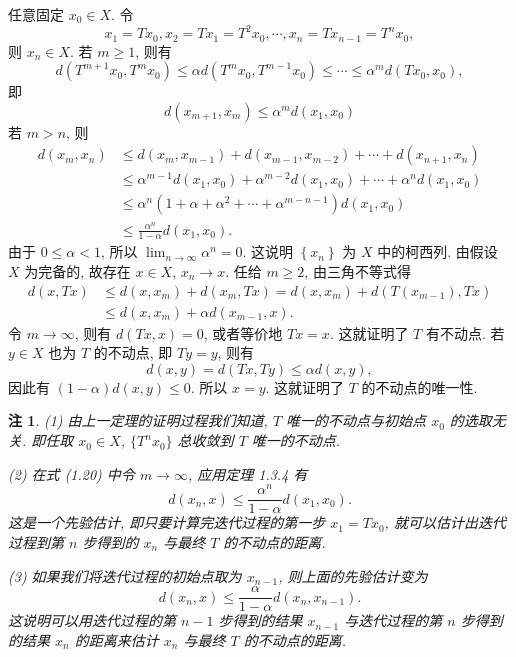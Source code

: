 \documentclass[openany]{ctexbook}
\makeatletter
\theoremstyle{kaiti}
\theoremstyle{normal}
\newtheorem{remark}{注}[section]
\renewenvironment{proof}[1][\proofname]{\par
    \pushQED{\qed}%
    \normalfont \topsep6\p@\@plus6\p@\relax
    \trivlist
    \item\relax
    {\heiti #1}\hspace{2\labelsep}\ignorespaces
  }{%
    \popQED\endtrivlist\@endpefalse
  }
\makeatother
\begin{document}
\begin{proof}
任意固定 $x_0 \in X$. 令
$$
x_1=T x_0, x_2=T x_1=T^2 x_0, \cdots, x_n=T x_{n-1}=T^n x_0,
$$
则 $x_n \in X$. 若 $m \geqslant 1$, 则有
$$
d\left(T^{m+1} x_0, T^m x_0\right) \leqslant \alpha d\left(T^m x_0, T^{m-1} x_0\right) \leqslant \cdots \leqslant \alpha^m d\left(T x_0, x_0\right),
$$
即
$$
d\left(x_{m+1}, x_m\right) \leqslant \alpha^m d\left(x_1, x_0\right)
$$
若 $m>n$, 则
\begin{equation}
  \begin{aligned}
    d\left(x_m, x_n\right) & \leqslant d\left(x_m, x_{m-1}\right)+d\left(x_{m-1}, x_{m-2}\right)+\cdots+d\left(x_{n+1}, x_n\right) \\
    & \leqslant \alpha^{m-1} d\left(x_1, x_0\right)+\alpha^{m-2} d\left(x_1, x_0\right)+\cdots+\alpha^n d\left(x_1, x_0\right) \\
    & \leqslant \alpha^n\left(1+\alpha+\alpha^2+\cdots+\alpha^{m-n-1}\right) d\left(x_1, x_0\right) \\
    & \leqslant \frac{\alpha^n}{1-\alpha} d\left(x_1, x_0\right).
  \end{aligned}
\end{equation}
由于 $0 \leqslant \alpha<1$, 所以 $\lim_{n \rightarrow \infty} \alpha^n=0$. 这说明 $\left\{x_n\right\}$ 为 $X$ 中的柯西列. 由假设 $X$ 为完备的, 故存在 $x \in X$, $x_n \rightarrow x$. 任给 $m \geqslant 2$, 由三角不等式得
$$
\begin{aligned}
d(x, T x) & \leqslant d\left(x, x_m\right)+d\left(x_m, T x\right)=d\left(x, x_m\right)+d\left(T\left(x_{m-1}\right), T x\right) \\
& \leqslant d\left(x, x_m\right)+\alpha d\left(x_{m-1}, x\right).
\end{aligned}
$$
令 $m \rightarrow \infty$, 则有 $d(T x, x)=0$, 或者等价地 $T x=x$. 这就证明了 $T$ 有不动点. 若 $y \in X$ 也为 $T$ 的不动点, 即 $Ty=y$, 则有
$$
d(x, y)=d(T x, T y) \leqslant \alpha d(x, y),
$$
因此有 $(1-\alpha) d(x, y) \leqslant 0$. 所以 $x=y$. 这就证明了 $T$ 的不动点的唯一性.
\end{proof}

\begin{remark}
(1) 由上一定理的证明过程我们知道, $T$ 唯一的不动点与初始点 $x_0$ 的选取无关. 即任取 $x_0\in X$, $\{T^n x_0\}$ 总收敛到 $T$ 唯一的不动点.

(2) 在式 (1.20) 中令 $m \rightarrow \infty$, 应用定理 1.3.4 有
$$
d\left(x_n, x\right) \leqslant \frac{\alpha^n}{1-\alpha} d\left(x_1, x_0\right).
$$
这是一个先验估计, 即只要计算完迭代过程的第一步 $x_1=T x_0$, 就可以估计出迭代过程到第 $n$ 步得到的 $x_n$ 与最终 $T$ 的不动点的距离.

(3) 如果我们将迭代过程的初始点取为 $x_{n-1}$, 则上面的先验估计变为
$$
d\left(x_n, x\right) \leqslant \frac{\alpha}{1-\alpha} d\left(x_n, x_{n-1}\right).
$$
这说明可以用迭代过程的第 $n-1$ 步得到的结果 $x_{n-1}$ 与迭代过程的第 $n$ 步得到的结果 $x_n$ 的距离来估计 $x_n$ 与最终 $T$ 的不动点的距离.
\end{remark}
\end{document}
